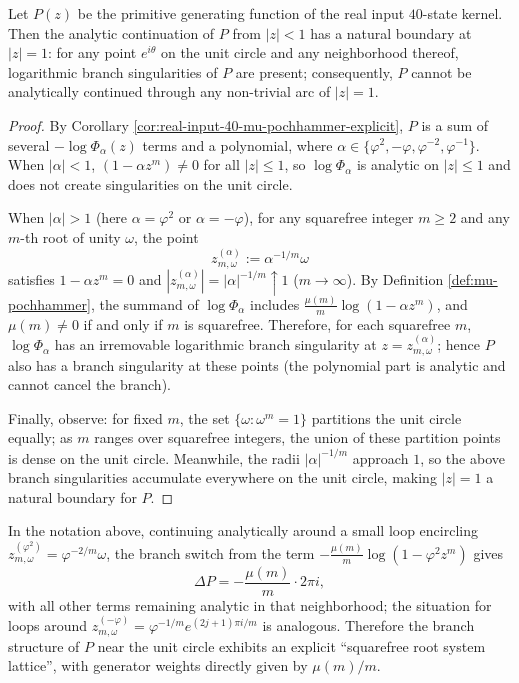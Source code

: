 \begin{theorem}\label{thm:primitive-natural-boundary-unit-circle}
Let \(P(z)\) be the primitive generating function of the real input \(40\)-state kernel. Then the analytic continuation of \(P\) from \(|z|<1\) has a natural boundary at \(|z|=1\):
for any point \(e^{i\theta}\) on the unit circle and any neighborhood thereof, logarithmic branch singularities of \(P\) are present; consequently, \(P\) cannot be analytically continued through any non-trivial arc of \(|z|=1\).
\end{theorem}
\begin{proof}
By Corollary \ref{cor:real-input-40-mu-pochhammer-explicit}, \(P\) is a sum of several \(-\log\Phi_\alpha(z)\) terms and a polynomial, where \(\alpha\in\{\varphi^2,-\varphi,\varphi^{-2},\varphi^{-1}\}\).
When \(|\alpha|<1\), \((1-\alpha z^m)\neq 0\) for all \(|z|\le 1\), so \(\log\Phi_\alpha\) is analytic on \(|z|\le 1\) and does not create singularities on the unit circle.

When \(|\alpha|>1\) (here \(\alpha=\varphi^2\) or \(\alpha=-\varphi\)), for any squarefree integer \(m\ge 2\) and any \(m\)-th root of unity \(\omega\), the point
\[
z_{m,\omega}^{(\alpha)}:=\alpha^{-1/m}\omega
\]
satisfies \(1-\alpha z^m=0\) and \(|z_{m,\omega}^{(\alpha)}|=|\alpha|^{-1/m}\uparrow 1\) (\(m\to\infty\)).
By Definition \ref{def:mu-pochhammer}, the summand of \(\log\Phi_\alpha\) includes
\(\frac{\mu(m)}{m}\log(1-\alpha z^m)\), and \(\mu(m)\neq 0\) if and only if \(m\) is squarefree.
Therefore, for each squarefree \(m\), \(\log\Phi_\alpha\) has an irremovable logarithmic branch singularity at \(z=z_{m,\omega}^{(\alpha)}\); hence \(P\) also has a branch singularity at these points (the polynomial part is analytic and cannot cancel the branch).

Finally, observe: for fixed \(m\), the set \(\{\omega:\omega^m=1\}\) partitions the unit circle equally; as \(m\) ranges over squarefree integers, the union of these partition points is dense on the unit circle.
Meanwhile, the radii \(|\alpha|^{-1/m}\) approach \(1\), so the above branch singularities accumulate everywhere on the unit circle, making \(|z|=1\) a natural boundary for \(P\).
\end{proof}
\begin{remark}\label{rem:primitive-monodromy-mu}
In the notation above, continuing analytically around a small loop encircling \(z_{m,\omega}^{(\varphi^2)}=\varphi^{-2/m}\omega\),
the branch switch from the term \(-\frac{\mu(m)}{m}\log(1-\varphi^2 z^m)\) gives
\[
\Delta P=-\frac{\mu(m)}{m}\cdot 2\pi i,
\]
with all other terms remaining analytic in that neighborhood; the situation for loops around \(z_{m,\omega}^{(-\varphi)}=\varphi^{-1/m}e^{(2j+1)\pi i/m}\) is analogous.
Therefore the branch structure of \(P\) near the unit circle exhibits an explicit ``squarefree root system lattice'', with generator weights directly given by \(\mu(m)/m\).
\end{remark}
